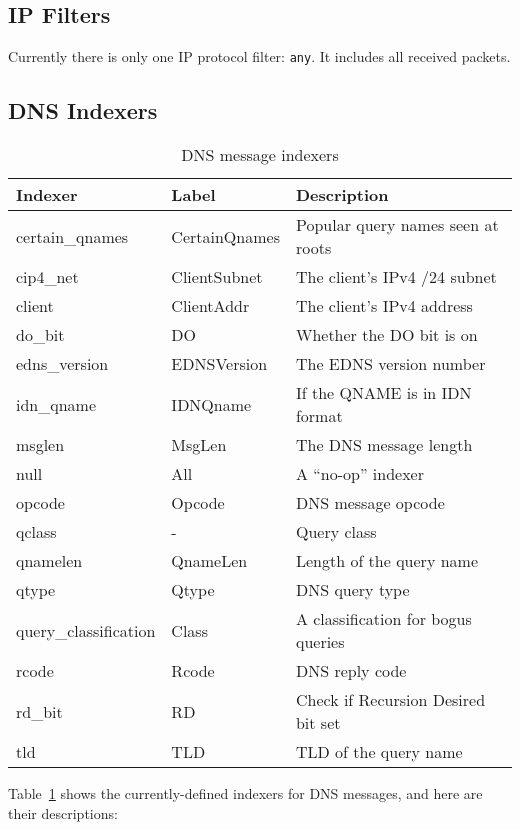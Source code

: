 \documentclass{report}
\begin{document}
\subsection{IP Filters}

Currently there is only one IP protocol filter: {\tt any\/}.
It includes all received packets.


\subsection{DNS Indexers}

\begin{table}
\begin{center}
\begin{tabular}{|lll|}
\hline
Indexer & Label & Description \\
\hline 
certain\_qnames & CertainQnames & Popular query names seen at roots \\
cip4\_net & ClientSubnet & The client's IPv4 /24 subnet \\
client & ClientAddr & The client's IPv4 address \\
do\_bit & DO & Whether the DO bit is on \\
edns\_version & EDNSVersion & The EDNS version number \\
idn\_qname & IDNQname & If the QNAME is in IDN format \\
msglen & MsgLen & The DNS message length \\
null & All & A ``no-op'' indexer \\
opcode & Opcode & DNS message opcode \\
qclass & - & Query class \\
qnamelen & QnameLen & Length of the query name \\
qtype & Qtype & DNS query type \\
query\_classification & Class & A classification for bogus queries \\
rcode & Rcode & DNS reply code \\
rd\_bit & RD & Check if Recursion Desired bit set \\
tld & TLD & TLD of the query name \\
\hline
\end{tabular}
\caption{\label{tbl-dns-indexers}DNS message indexers}
\end{center}
\end{table}

Table~\ref{tbl-dns-indexers} shows the currently-defined indexers
for DNS messages, and here are their descriptions:
\end{document}
